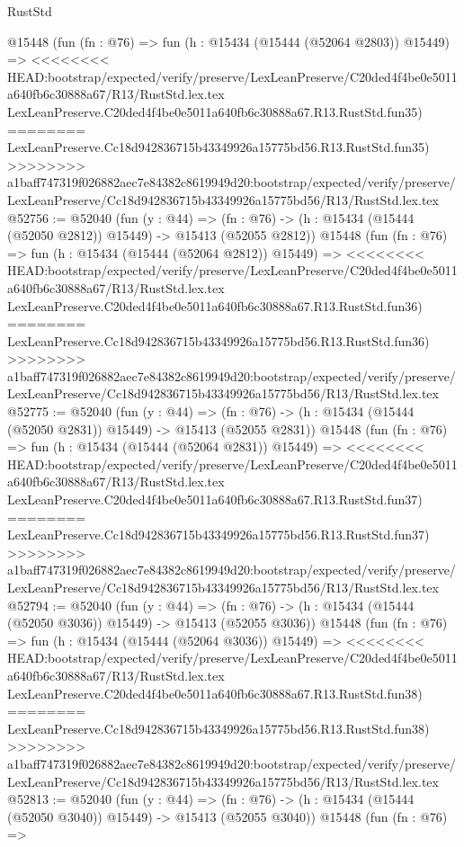 \begin{lexlean}{RustStd}
\begin{coremodule}
{\begin{coremodule}
{{{{{{{{{{{{{{{{{{{{{{{{{{{{{{{{{{{{{{{{{{{{{{{{{{{{{{{{{{{{    @15448
    (fun (fn : @76) =>
    fun (h : @15434 (@15444 (@52064 @2803)) @15449) =>
<<<<<<<< HEAD:bootstrap/expected/verify/preserve/LexLeanPreserve/C20ded4f4be0e5011a640fb6c30888a67/R13/RustStd.lex.tex
    LexLeanPreserve.C20ded4f4be0e5011a640fb6c30888a67.R13.RustStd.fun35)
========
    LexLeanPreserve.Cc18d942836715b43349926a15775bd56.R13.RustStd.fun35)
>>>>>>>> a1baff747319f026882aec7e84382c8619949d20:bootstrap/expected/verify/preserve/LexLeanPreserve/Cc18d942836715b43349926a15775bd56/R13/RustStd.lex.tex
@52756 := @52040
    (fun (y : @44) =>
    (fn : @76) -> (h : @15434 (@15444 (@52050 @2812)) @15449) -> @15413 (@52055 @2812))
    @15448
    (fun (fn : @76) =>
    fun (h : @15434 (@15444 (@52064 @2812)) @15449) =>
<<<<<<<< HEAD:bootstrap/expected/verify/preserve/LexLeanPreserve/C20ded4f4be0e5011a640fb6c30888a67/R13/RustStd.lex.tex
    LexLeanPreserve.C20ded4f4be0e5011a640fb6c30888a67.R13.RustStd.fun36)
========
    LexLeanPreserve.Cc18d942836715b43349926a15775bd56.R13.RustStd.fun36)
>>>>>>>> a1baff747319f026882aec7e84382c8619949d20:bootstrap/expected/verify/preserve/LexLeanPreserve/Cc18d942836715b43349926a15775bd56/R13/RustStd.lex.tex
@52775 := @52040
    (fun (y : @44) =>
    (fn : @76) -> (h : @15434 (@15444 (@52050 @2831)) @15449) -> @15413 (@52055 @2831))
    @15448
    (fun (fn : @76) =>
    fun (h : @15434 (@15444 (@52064 @2831)) @15449) =>
<<<<<<<< HEAD:bootstrap/expected/verify/preserve/LexLeanPreserve/C20ded4f4be0e5011a640fb6c30888a67/R13/RustStd.lex.tex
    LexLeanPreserve.C20ded4f4be0e5011a640fb6c30888a67.R13.RustStd.fun37)
========
    LexLeanPreserve.Cc18d942836715b43349926a15775bd56.R13.RustStd.fun37)
>>>>>>>> a1baff747319f026882aec7e84382c8619949d20:bootstrap/expected/verify/preserve/LexLeanPreserve/Cc18d942836715b43349926a15775bd56/R13/RustStd.lex.tex
@52794 := @52040
    (fun (y : @44) =>
    (fn : @76) -> (h : @15434 (@15444 (@52050 @3036)) @15449) -> @15413 (@52055 @3036))
    @15448
    (fun (fn : @76) =>
    fun (h : @15434 (@15444 (@52064 @3036)) @15449) =>
<<<<<<<< HEAD:bootstrap/expected/verify/preserve/LexLeanPreserve/C20ded4f4be0e5011a640fb6c30888a67/R13/RustStd.lex.tex
    LexLeanPreserve.C20ded4f4be0e5011a640fb6c30888a67.R13.RustStd.fun38)
========
    LexLeanPreserve.Cc18d942836715b43349926a15775bd56.R13.RustStd.fun38)
>>>>>>>> a1baff747319f026882aec7e84382c8619949d20:bootstrap/expected/verify/preserve/LexLeanPreserve/Cc18d942836715b43349926a15775bd56/R13/RustStd.lex.tex
@52813 := @52040
    (fun (y : @44) =>
    (fn : @76) -> (h : @15434 (@15444 (@52050 @3040)) @15449) -> @15413 (@52055 @3040))
    @15448
    (fun (fn : @76) =>
}}}}}}}}}}}}}}}}}}}}}}}}}}}}}}}}}}}}}}}}}}}}}}}}}}}}}}}}}}}}
\end{coremodule}}
\end{coremodule}
\end{lexlean}
